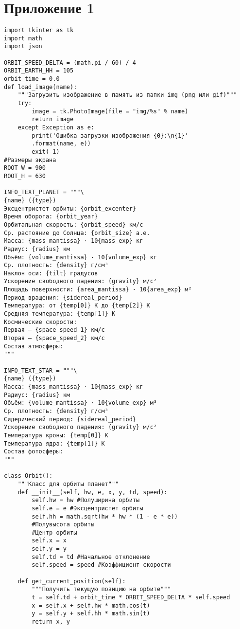 \documentclass[a4paper,14pt]{extarticle}
\begin{document}
\newpage\section*{Приложение 1} 
\begin{verbatim}
import tkinter as tk
import math
import json

ORBIT_SPEED_DELTA = (math.pi / 60) / 4
ORBIT_EARTH_HH = 105
orbit_time = 0.0
def load_image(name):
    """Загрузить изображение в память из папки img (png или gif)"""
    try:
        image = tk.PhotoImage(file = "img/%s" % name)
        return image
    except Exception as e:
        print('Ошибка загрузки изображения {0}:\n{1}'
        .format(name, e))
        exit(-1)
#Размеры экрана
ROOT_W = 900
ROOT_H = 630

INFO_TEXT_PLANET = """\
{name} ({type})
Эксцентристет орбиты: {orbit_excenter}
Время оборота: {orbit_year}
Орбитальная скорость: {orbit_speed} км/с
Ср. растояние до Солнца: {orbit_size} а.е.
Масса: {mass_mantissa} · 10{mass_exp} кг
Радиус: {radius} км
Объём: {volume_mantissa} · 10{volume_exp} кг
Ср. плотность: {density} г/см³
Наклон оси: {tilt} градусов
Ускорение свободного падения: {gravity} м/с²
Площадь поверхности: {area_mantissa} · 10{area_exp} м²
Период вращения: {sidereal_period}
Температура: от {temp[0]} К до {temp[2]} К
Средняя температура: {temp[1]} К
Космические скорости:
Первая — {space_speed_1} км/с
Вторая — {space_speed_2} км/с
Состав атмосферы:
"""

INFO_TEXT_STAR = """\
{name} ({type})
Масса: {mass_mantissa} · 10{mass_exp} кг
Радиус: {radius} км
Объём: {volume_mantissa} · 10{volume_exp} м³
Ср. плотность: {density} г/см³
Сидерический период: {sidereal_period}
Ускорение свободного падения: {gravity} м/с²
Температура кроны: {temp[0]} К
Температура ядра: {temp[1]} К
Состав фотосферы:
"""

class Orbit():
    """Класс для орбиты планет"""
    def __init__(self, hw, e, x, y, td, speed):
        self.hw = hw #Полуширина орбиты
        self.e = e #Эксцентристет орбиты
        self.hh = math.sqrt(hw * hw * (1 - e * e))
        #Полувысота орбиты
        #Центр орбиты
        self.x = x
        self.y = y
        self.td = td #Начальное отклонение
        self.speed = speed #Коэффициент скорости
    
    def get_current_position(self):
        """Получить текущую позицию на орбите"""
        t = self.td + orbit_time * ORBIT_SPEED_DELTA * self.speed
        x = self.x + self.hw * math.cos(t)
        y = self.y + self.hh * math.sin(t)
        return x, y
    

\end{verbatim}
\end{document}
